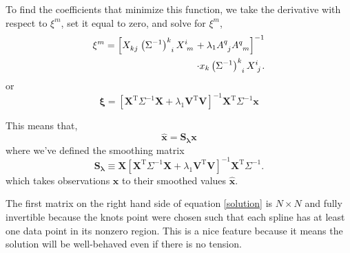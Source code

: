 \documentclass[10pt,journal]{IEEEtran}
\begin{document}
To find the coefficients that minimize this function, we take the derivative with respect to $\xi^m$, set it equal to zero, and solve for $\xi^m$,
\begin{equation}
\begin{split}
\xi^m = \left[ X\indices{_k_j} \left(\Sigma^{-1}\right)\indices{^k_i}  X\indices{^i_m} + \lambda_1 {A}\indices{^q_j}{A}\indices{^q_m} \right]^{-1} \\
\cdot x_k \left(\Sigma^{-1}\right)\indices{^k_i}   X\indices{^i_j}.
\end{split}
\label{solution}
\end{equation}
or
\begin{equation}
\label{solution2}
\mathbf{\xi} = \left[ \mathbf{X}^{\textrm{T}} \Sigma^{-1} \mathbf{X} + \lambda_1 \mathbf{V}^{\textrm{T}} \mathbf{V} \right]^{-1} \mathbf{X}^{\textrm{T}} \Sigma^{-1} \mathbf{x}
\end{equation}

This means that,
\begin{equation}
\mathbf{\hat{x}} = \mathbf{S_\lambda} \mathbf{x}
\end{equation}
where we've defined the smoothing matrix
\begin{equation}
\label{smoothing-operator}
\mathbf{S_\lambda} \equiv \mathbf{X} \left[ \mathbf{X}^{\textrm{T}} \Sigma^{-1} \mathbf{X} + \lambda_1 \mathbf{V}^{\textrm{T}} \mathbf{V} \right]^{-1} \mathbf{X}^{\textrm{T}} \Sigma^{-1}.
\end{equation}
which takes observations $\mathbf{x}$ to their smoothed values $\mathbf{\hat{x}}$.

The first matrix on the right hand side of equation \ref{solution} is $N\times N$ and fully invertible because the knots point were chosen such that each spline has at least one data point in its nonzero region. This is a nice feature because it means the solution will be well-behaved even if there is no tension.
\end{document}
